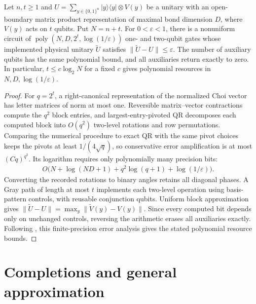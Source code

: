 \begin{lemma}
    \label{thm:mpu_controlled_target_approximation}
    Let $n,t\geq1$ and
    $U=\sum_{y\in\{0,1\}^n}|y\rangle\langle y|\otimes V(y)$
    be a unitary with an open-boundary matrix product representation
    of maximal bond dimension $D$, where $V(y)$ acts on $t$ qubits.
    Put $N=n+t$. For $0<\varepsilon<1$, there is a nonuniform
    circuit of $\operatorname{poly}(N,D,2^t,\log(1/\varepsilon))$
    one- and two-qubit gates whose implemented physical unitary
    $\widetilde U$ satisfies $\|\widetilde U-U\|\leq\varepsilon$.
    The number of auxiliary qubits has the same polynomial bound,
    and all auxiliaries return exactly to zero.
    In particular, $t\leq c\log_2N$ for a fixed $c$ gives polynomial
    resources in $N,D,\log(1/\varepsilon)$.
\end{lemma}
\begin{proof}
    For $q=2^t$, a right-canonical representation of the normalized
    Choi vector has letter matrices of norm at most one.
    Reversible matrix--vector contractions compute the $q^2$ block
    entries, and largest-entry-pivoted QR decomposes each computed
    block into $O(q^2)$ two-level rotations and row permutations.
    Comparing the numerical procedure to exact QR with the same pivot
    choices keeps the pivots at least $1/(4\sqrt q)$, so conservative
    error amplification is at most $(Cq)^{q^2}$.
    Its logarithm requires only polynomially many precision bits:
    \begin{align}
        O\bigl(N+\log(ND+1)+q^2\log(q+1)
        +\log(1/\varepsilon)\bigr).
    \end{align}
    Converting the recorded rotations to binary angles retains all
    diagonal phases. A Gray path of length at most $t$ implements
    each two-level operation using basis-pattern controls, with
    reusable conjunction qubits. Uniform block approximation gives
    $\|\widetilde U-U\|=\max_y\|\widetilde V(y)-V(y)\|$.
    Since every computed bit depends only on unchanged controls,
    reversing the arithmetic erases all auxiliaries exactly.
    Following \cite{MPUSchmidtObstructions2026}, this finite-precision
    error analysis gives the stated polynomial resource bounds.
\end{proof}

\section{Completions and general approximation}

